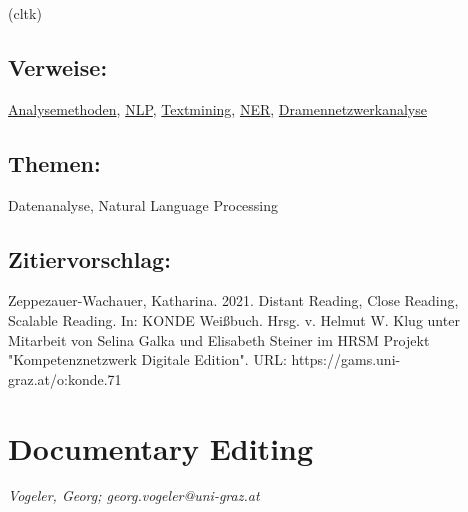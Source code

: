 \documentclass{article}
\begin{document}
{                           (cltk)}\subsection*{Verweise:}\href{https://gams.uni-graz.at/o:konde.16}{Analysemethoden}, \href{https://gams.uni-graz.at/o:konde.145}{NLP}, \href{https://gams.uni-graz.at/o:konde.194}{Textmining}, \href{https://gams.uni-graz.at/o:konde.141}{NER}, \href{https://gams.uni-graz.at/o:konde.74}{Dramennetzwerkanalyse}\subsection*{Themen:}Datenanalyse, Natural Language Processing\subsection*{Zitiervorschlag:}Zeppezauer-Wachauer, Katharina. 2021. Distant Reading, Close Reading, Scalable Reading. In: KONDE Weißbuch. Hrsg. v. Helmut W. Klug unter Mitarbeit von Selina Galka und Elisabeth Steiner im HRSM Projekt "Kompetenznetzwerk Digitale Edition". URL: https://gams.uni-graz.at/o:konde.71\newpage\section*{Documentary Editing} \emph{Vogeler, Georg; georg.vogeler@uni-graz.at}\\
        
\end{document}

